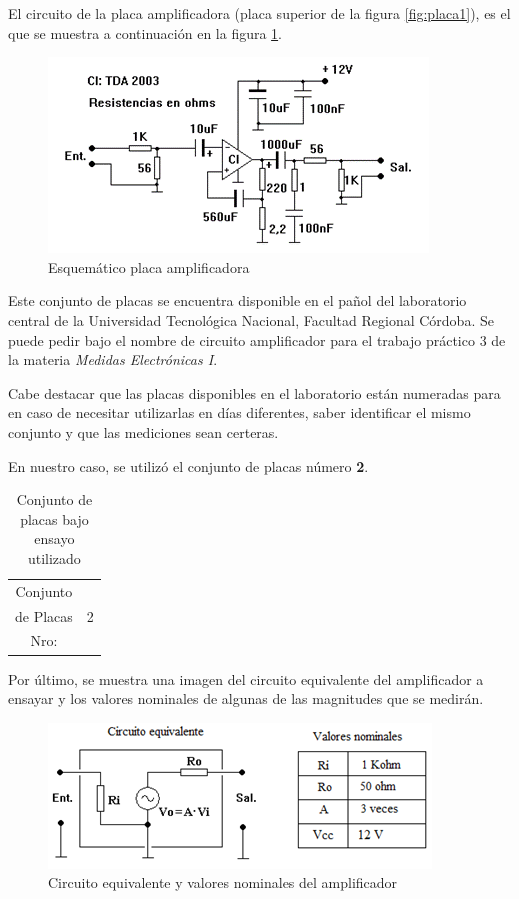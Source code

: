 El circuito de la placa amplificadora (placa superior de la figura \ref{fig:placa1}), es el que se muestra a continuación en la figura \ref{fig:amp1}.


\begin{figure}[H]
    \centering
    \includegraphics[width=0.68\linewidth]{Imagenes/amp1.png}
    \caption{Esquemático placa amplificadora}
    \label{fig:amp1}
\end{figure}

Este conjunto de placas se encuentra disponible en el pañol del laboratorio central de la Universidad Tecnológica Nacional, Facultad Regional Córdoba. Se puede pedir bajo el nombre de circuito amplificador para el trabajo práctico 3 de la materia \textit{Medidas Electrónicas I}. 

Cabe destacar que las placas disponibles en el laboratorio están numeradas para en caso de necesitar utilizarlas en días diferentes, saber identificar el mismo conjunto y que las mediciones sean certeras. 

En nuestro caso, se utilizó el conjunto de placas número \textbf{2}.

\begin{table}[H]
    \centering
    \begin{tabular}{|c|c|}
        \hline
            Conjunto &  \\
            de Placas & 2 \\
            Nro: & \\
        \hline
    \end{tabular}
    \def\tablename{Tabla} 
    \caption{Conjunto de placas bajo ensayo utilizado}
    \label{tab:DUT}
\end{table}

Por último, se muestra una imagen del circuito equivalente del amplificador a ensayar y los valores nominales de algunas de las magnitudes que se medirán.

\begin{figure}[H]
    \centering
    \includegraphics[width=0.7\linewidth]{Imagenes/amp1circeq.png}
    \caption{Circuito equivalente y valores nominales del amplificador}
    \label{fig:amp1circeq}
\end{figure}





